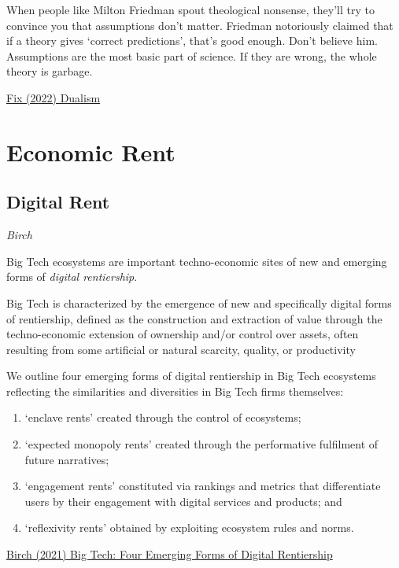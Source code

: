 \documentclass[
]{book}
\begin{document}
When people like Milton Friedman spout theological nonsense, they'll try to convince you that assumptions don't matter. Friedman notoriously claimed that if a theory gives `correct predictions', that's good enough. Don't believe him. Assumptions are the most basic part of science. If they are wrong, the whole theory is garbage.

\href{https://economicsfromthetopdown.com/2022/08/10/dualism-in-science-theo\%20logy-and-economics/}{Fix (2022) Dualism}

\hypertarget{economic-rent}{%
\chapter{Economic Rent}\label{economic-rent}}

\hypertarget{digital-rent}{%
\section{Digital Rent}\label{digital-rent}}

\emph{Birch}

Big Tech ecosystems are important techno-economic sites of new and
emerging forms of \emph{digital rentiership}.

Big Tech is characterized by the emergence of new and specifically digital forms of rentiership, defined as the construction and extraction of value through the techno-economic extension of ownership and/or control over assets, often resulting from some artificial or natural scarcity, quality, or productivity

We outline four emerging forms of digital rentiership in Big Tech ecosystems reflecting the similarities and diversities in Big Tech firms themselves:

\begin{enumerate}
\def\labelenumi{(\arabic{enumi})}
\item
  `enclave rents' created through the control of ecosystems;
\item
  `expected monopoly rents' created through the performative fulfilment of future narratives;
\item
  `engagement rents' constituted via rankings and metrics that differentiate users by their engagement with digital services and products; and
\item
  `reflexivity rents' obtained by exploiting ecosystem rules and norms.
\end{enumerate}

\href{https://www.tandfonline.com/doi/full/10.1080/09505431.2021.1932794}{Birch (2021) Big Tech: Four Emerging Forms of Digital Rentiership}
\end{document}
